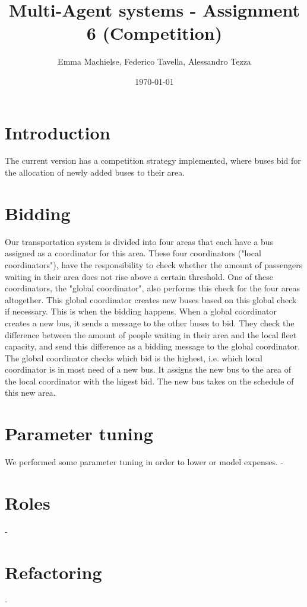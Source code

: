 \documentclass[a4paper]{article}
\title{Multi-Agent systems - Assignment 6 (Competition)}
\author{Emma Machielse, Federico Tavella, Alessandro Tezza}
\date{\today}
\begin{document}
\maketitle

\section{Introduction}
The current version has a competition strategy implemented, where buses bid for the allocation of newly added buses to their area.

\section{Bidding} 

Our transportation system is divided into four areas that each have a bus assigned as a coordinator for this area. These four coordinators ("local coordinators"), have the responsibility to check whether the amount of passengers waiting in their area does not rise above a certain threshold. One of these coordinators, the "global coordinator", also performs this check for the four areas altogether. This global coordinator creates new buses based on this global check if necessary. 
\newline
This is when the bidding happens. When a global coordinator creates a new bus, it sends a message to the other buses to bid. They check the difference between the amount of people waiting in their area and the local fleet capacity, and send this difference as a bidding message to the global coordinator. The global coordinator checks which bid is the highest, i.e. which local coordinator is in most need of a new bus. It assigns the new bus to the area of the local coordinator with the higest bid. The new bus takes on the schedule of this new area.

\section{Parameter tuning}
We performed some parameter tuning in order to lower or model expenses.
-

\section{Roles}

-

\section{Refactoring}

-
\end{document}
